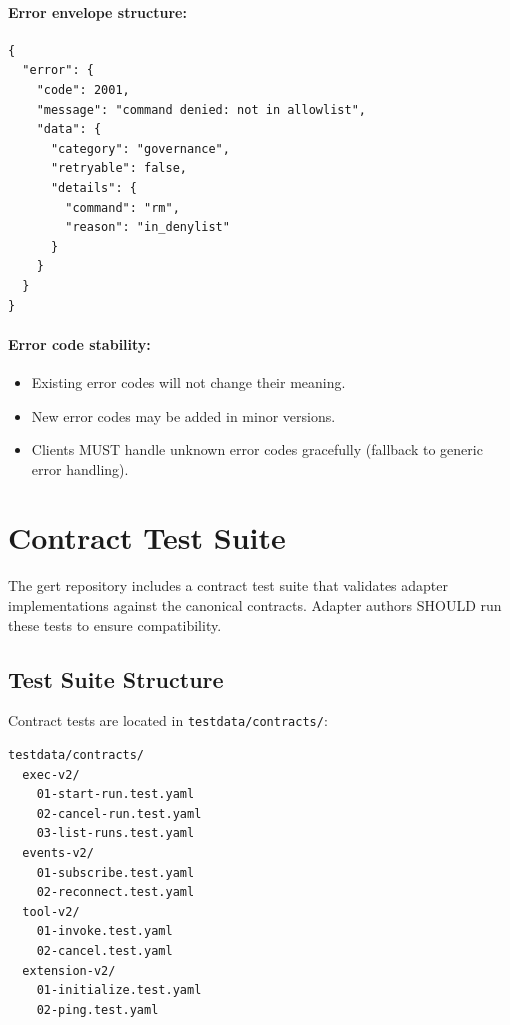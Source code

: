 \paragraph{Error envelope structure:}

\begin{verbatim}
{
  "error": {
    "code": 2001,
    "message": "command denied: not in allowlist",
    "data": {
      "category": "governance",
      "retryable": false,
      "details": {
        "command": "rm",
        "reason": "in_denylist"
      }
    }
  }
}
\end{verbatim}

\paragraph{Error code stability:}

\begin{itemize}
  \item Existing error codes will not change their meaning.
  \item New error codes may be added in minor versions.
  \item Clients MUST handle unknown error codes gracefully (fallback to generic
        error handling).
\end{itemize}

\section{Contract Test Suite}
\label{sec:contract-test-suite}

The gert repository includes a contract test suite that validates adapter
implementations against the canonical contracts.  Adapter authors SHOULD run
these tests to ensure compatibility.

\subsection{Test Suite Structure}

Contract tests are located in \texttt{testdata/contracts/}:

\begin{verbatim}
testdata/contracts/
  exec-v2/
    01-start-run.test.yaml
    02-cancel-run.test.yaml
    03-list-runs.test.yaml
  events-v2/
    01-subscribe.test.yaml
    02-reconnect.test.yaml
  tool-v2/
    01-invoke.test.yaml
    02-cancel.test.yaml
  extension-v2/
    01-initialize.test.yaml
    02-ping.test.yaml
\end{verbatim}

